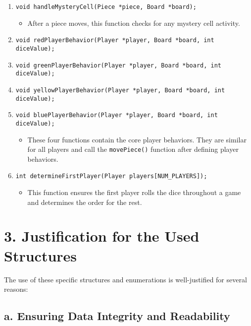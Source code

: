 \documentclass[a4paper,12pt]{article}
\begin{document}
\begin{enumerate}
    \item \texttt{void handleMysteryCell(Piece *piece, Board *board);}
    \begin{itemize}
        \item After a piece moves, this function checks for any mystery cell activity.
    \end{itemize}

    \item \texttt{void redPlayerBehavior(Player *player, Board *board, int diceValue);}
    \item \texttt{void greenPlayerBehavior(Player *player, Board *board, int diceValue);}
    \item \texttt{void yellowPlayerBehavior(Player *player, Board *board, int diceValue);}
    \item \texttt{void bluePlayerBehavior(Player *player, Board *board, int diceValue);}
    \begin{itemize}
        \item These four functions contain the core player behaviors. They are similar for all players and call the \texttt{movePiece()} function after defining player behaviors.
    \end{itemize}

    \item \texttt{int determineFirstPlayer(Player players[NUM\_PLAYERS]);}
    \begin{itemize}
        \item This function ensures the first player rolls the dice throughout a game and determines the order for the rest.
    \end{itemize}
\end{enumerate}

\section*{3. Justification for the Used Structures}

The use of these specific structures and enumerations is well-justified for several reasons:

\subsection*{a. Ensuring Data Integrity and Readability}
\end{document}
